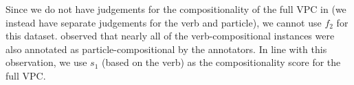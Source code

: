 \documentclass[output=paper
,modfonts
,nonflat]{langsci/langscibook}
\begin{document}
Since we do not have judgements for the compositionality of the full VPC
in \BANNARD (we instead have separate judgements for the verb and
particle), we cannot use $f_{2}$ for this dataset. \citet{bannard2003}
observed that nearly all of the verb-compositional instances were also
annotated as particle-compositional by the annotators. In line with this
observation, we use $s_1$ (based on the verb) as the compositionality
score for the full VPC.





\end{document}
